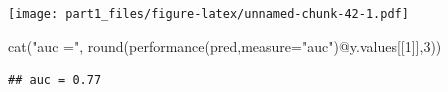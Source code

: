 \documentclass[
]{article}
\newenvironment{Shaded}{\begin{snugshade}}{\end{snugshade}}
\newcommand{\AttributeTok}[1]{\textcolor[rgb]{0.77,0.63,0.00}{#1}}
\newcommand{\DecValTok}[1]{\textcolor[rgb]{0.00,0.00,0.81}{#1}}
\newcommand{\FunctionTok}[1]{\textcolor[rgb]{0.00,0.00,0.00}{#1}}
\newcommand{\NormalTok}[1]{#1}
\newcommand{\SpecialCharTok}[1]{\textcolor[rgb]{0.00,0.00,0.00}{#1}}
\newcommand{\StringTok}[1]{\textcolor[rgb]{0.31,0.60,0.02}{#1}}
\begin{document}
\texttt{[image: part1\_files/figure-latex/unnamed-chunk-42-1.pdf]}

\begin{Shaded}
\begin{Highlighting}[]
\FunctionTok{cat}\NormalTok{(}\StringTok{"auc ="}\NormalTok{, }\FunctionTok{round}\NormalTok{(}\FunctionTok{performance}\NormalTok{(pred,}\AttributeTok{measure=}\StringTok{"auc"}\NormalTok{)}\SpecialCharTok{@}\NormalTok{y.values[[}\DecValTok{1}\NormalTok{]],}\DecValTok{3}\NormalTok{))}
\end{Highlighting}
\end{Shaded}

\begin{verbatim}
## auc = 0.77
\end{verbatim}
\end{document}
